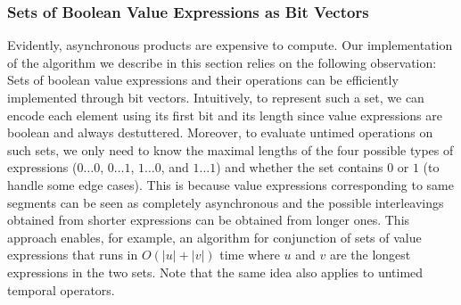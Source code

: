 






\subsubsection{Sets of Boolean Value Expressions as Bit Vectors}
Evidently, asynchronous products are expensive to compute.
Our implementation of the algorithm we describe in this section relies on the following observation:
Sets of boolean value expressions and their operations can be efficiently implemented through bit vectors.
Intuitively, to represent such a set, we can encode each element using its first bit and its length since value expressions are boolean and always destuttered.
Moreover, to evaluate untimed operations on such sets, we only need to know the maximal lengths of the four possible types of expressions ($0 \ldots 0$, $0 \ldots 1$, $1 \ldots 0$, and $1 \ldots 1$) and whether the set contains $0$ or $1$ (to handle some edge cases).
This is because value expressions corresponding to same segments can be seen as completely asynchronous and the possible interleavings obtained from shorter expressions can be obtained from longer ones.
This approach enables, for example, an algorithm for conjunction of sets of value expressions that runs in $O(|u| + |v|)$ time where $u$ and $v$ are the longest expressions in the two sets.
Note that the same idea also applies to untimed temporal operators.


